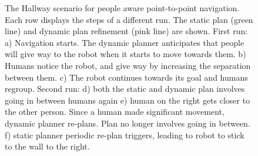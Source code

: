 \begin{figure}[p!]
{        }
    \caption{%
	The Hallway scenario for people aware point-to-point navigation. Each row displays the steps of a different run. The static plan (green line) and dynamic plan refinement (pink line) are shown. First run: a) Navigation starts. The dynamic planner anticipates that people will give way to the robot when it starts to move towards them. b) Humans notice the robot, and give way by increasing the separation between them. c) The robot continues towards its goal and humans regroup. Second run: d) both the static and dynamic plan involves going in between humans again e) human on the right gets closer to the other person. Since a human made significant movement, dynamic planner re-plans. Plan no longer involves going in between. f) static planner periodic re-plan triggers, leading to robot to stick to the wall to the right.
     }%
   \label{fig:corridor}
\end{figure}


